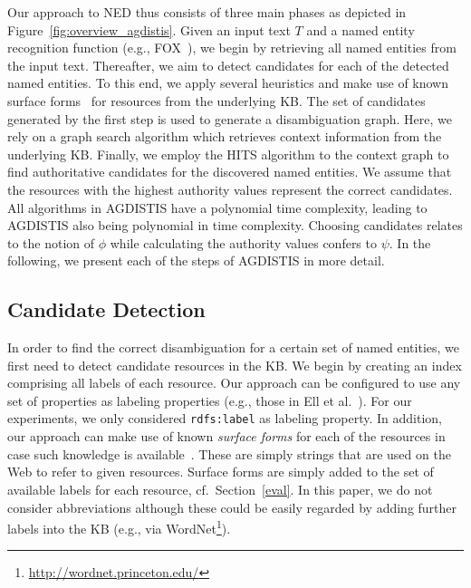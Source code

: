 Our approach to \ac{NED} thus consists of three main phases as depicted in Figure~\ref{fig:overview_agdistis}.
Given an input text $T$ and a named entity recognition function (e.g., FOX~\cite{FOX}), we begin by retrieving all named entities from the input text.
Thereafter, we aim to detect candidates for each of the detected named entities.
To this end, we apply several heuristics and make use of known surface forms~\cite{spotlight} for resources from the underlying \ac{KB}.
The set of candidates generated by the first step is used to generate a disambiguation graph. 
Here, we rely on a graph search algorithm which retrieves context information from the underlying \ac{KB}. 
Finally, we employ the  \ac{HITS} algorithm to the context graph to find authoritative candidates for the discovered named entities.
We assume that the resources with the highest authority values represent the correct candidates.
All algorithms in AGDISTIS have a polynomial time complexity, leading to AGDISTIS also being polynomial in time complexity.
Choosing candidates relates to the notion of $\phi$ while calculating the authority values confers to $\psi$.
In the following, we present each of the steps of AGDISTIS in more detail.

\subsection{Candidate Detection}\label{choosing}

In order to find the correct disambiguation for a certain set of named entities, we first need to detect candidate resources in the \ac{KB}. 
We begin by creating an index comprising all labels of each resource.
Our approach can be configured to use any set of properties as labeling properties (e.g., those in Ell et al.~\cite{ELL+11}). 
For our experiments, we only considered \texttt{rdfs:label} as labeling property.
In addition, our approach can make use of known \emph{surface forms} for each of the resources in case such knowledge is available~\cite{spotlight}.
These are simply strings that are used on the Web to refer to given resources.
Surface forms are simply added to the set of available labels for each resource, cf.\ Section~\ref{eval}.
In this paper, we do not consider abbreviations although these could be easily regarded by adding further labels into the \ac{KB} (e.g., via WordNet\footnote{\url{http://wordnet.princeton.edu/}}).

